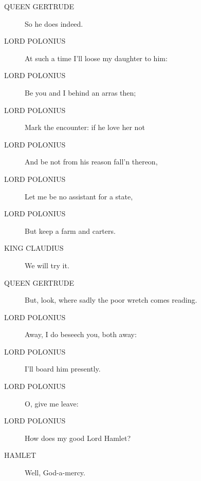 \documentclass{article}
\begin{document}
\begin{description}
            
\item[QUEEN GERTRUDE] So he does indeed.
\end{description}
          
\begin{description}
            
\item[LORD POLONIUS] At such a time I'll loose my daughter to him:
\item[LORD POLONIUS] Be you and I behind an arras then;
\item[LORD POLONIUS] Mark the encounter: if he love her not
\item[LORD POLONIUS] And be not from his reason fall'n thereon,
\item[LORD POLONIUS] Let me be no assistant for a state,
\item[LORD POLONIUS] But keep a farm and carters.
\end{description}
          
\begin{description}
            
\item[KING CLAUDIUS] We will try it.
\end{description}
          
\begin{description}
            
\item[QUEEN GERTRUDE] But, look, where sadly the poor wretch comes reading.
\end{description}
          
\begin{description}
            
\item[LORD POLONIUS] Away, I do beseech you, both away:
\item[LORD POLONIUS] I'll board him presently.
\item[LORD POLONIUS] O, give me leave:
\item[LORD POLONIUS] How does my good Lord Hamlet?
\end{description}
          
\begin{description}
            
\item[HAMLET] Well, God-a-mercy.
\end{description}
          
\end{document}
